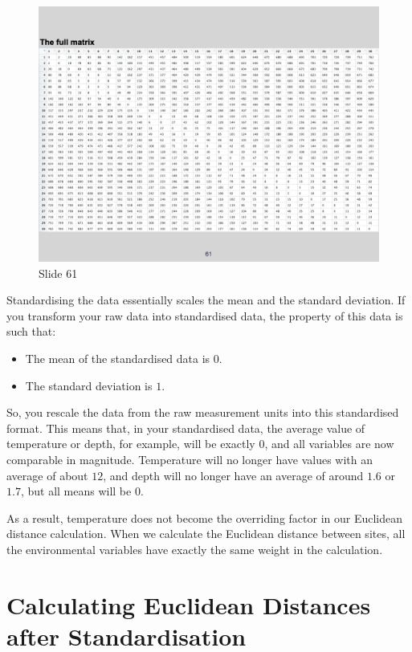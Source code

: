 \documentclass[
  10pt,
]{book}
\providecommand{\tightlist}{%
  \setlength{\itemsep}{0pt}\setlength{\parskip}{0pt}}
\begin{document}
\begin{figure}[ht]
\centering
\includegraphics[width=0.8\linewidth]{../images/BDC334/BDC334-061.jpeg}
\caption*{Slide 61}
\end{figure}

Standardising the data essentially scales the mean and the standard
deviation. If you transform your raw data into standardised data, the
property of this data is such that:

\begin{itemize}
\tightlist
\item
  The mean of the standardised data is \(0\).
\item
  The standard deviation is \(1\).
\end{itemize}

So, you rescale the data from the raw measurement units into this
standardised format. This means that, in your standardised data, the
average value of temperature or depth, for example, will be exactly
\(0\), and all variables are now comparable in magnitude. Temperature
will no longer have values with an average of about \(12\), and depth
will no longer have an average of around \(1.6\) or \(1.7\), but all
means will be \(0\).

As a result, temperature does not become the overriding factor in our
Euclidean distance calculation. When we calculate the Euclidean distance
between sites, all the environmental variables have exactly the same
weight in the calculation.

\section{Calculating Euclidean Distances after
Standardisation}\label{calculating-euclidean-distances-after-standardisation}
\end{document}
